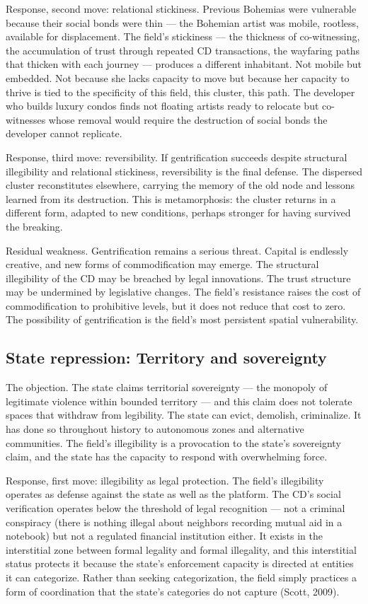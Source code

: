 Response, second move: relational stickiness. Previous Bohemias were vulnerable because their social bonds were thin — the Bohemian artist was mobile, rootless, available for displacement. The field's stickiness — the thickness of co-witnessing, the accumulation of trust through repeated CD transactions, the wayfaring paths that thicken with each journey — produces a different inhabitant. Not mobile but embedded. Not because she lacks capacity to move but because her capacity to thrive is tied to the specificity of this field, this cluster, this path. The developer who builds luxury condos finds not floating artists ready to relocate but co-witnesses whose removal would require the destruction of social bonds the developer cannot replicate.

Response, third move: reversibility. If gentrification succeeds despite structural illegibility and relational stickiness, reversibility is the final defense. The dispersed cluster reconstitutes elsewhere, carrying the memory of the old node and lessons learned from its destruction. This is metamorphosis: the cluster returns in a different form, adapted to new conditions, perhaps stronger for having survived the breaking.

Residual weakness. Gentrification remains a serious threat. Capital is endlessly creative, and new forms of commodification may emerge. The structural illegibility of the CD may be breached by legal innovations. The trust structure may be undermined by legislative changes. The field's resistance raises the cost of commodification to prohibitive levels, but it does not reduce that cost to zero. The possibility of gentrification is the field's most persistent spatial vulnerability.

\subsection{State repression: Territory and sovereignty}

The objection. The state claims territorial sovereignty — the monopoly of legitimate violence within bounded territory — and this claim does not tolerate spaces that withdraw from legibility. The state can evict, demolish, criminalize. It has done so throughout history to autonomous zones and alternative communities. The field's illegibility is a provocation to the state's sovereignty claim, and the state has the capacity to respond with overwhelming force.

Response, first move: illegibility as legal protection. The field's illegibility operates as defense against the state as well as the platform. The CD's social verification operates below the threshold of legal recognition — not a criminal conspiracy (there is nothing illegal about neighbors recording mutual aid in a notebook) but not a regulated financial institution either. It exists in the interstitial zone between formal legality and formal illegality, and this interstitial status protects it because the state's enforcement capacity is directed at entities it can categorize. Rather than seeking categorization, the field simply practices a form of coordination that the state's categories do not capture (Scott, 2009).

